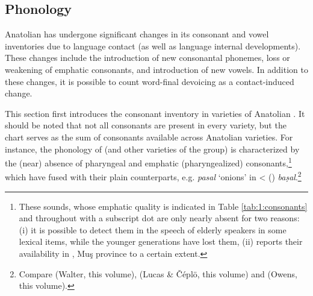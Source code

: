 \documentclass[output=paper]{langsci/langscibook}
\begin{document}
\subsection{Phonology}

Anatolian  has undergone significant changes in its consonant and vowel inventories due to language contact (as well as language internal developments). These changes include the introduction of new consonantal phonemes, loss or weakening of {emphatic consonants}, and introduction of new vowels. In addition to these changes, it is possible to count word-final {devoicing} as a contact-induced change.

This section first introduces the consonant inventory in varieties of Anatolian . It should be noted that not all consonants are present in every variety, but the chart serves as the sum of consonants available across Anatolian  varieties. For instance, the phonology of   (and other varieties of the  group) is characterized by the (near) absence of {pharyngeal} and {emphatic} ({pharyngealized}) consonants,\footnote{These sounds, whose {emphatic} quality is indicated in Table \ref{tab:1:consonants} and throughout with a subscript dot are only nearly absent for two reasons: (i) it is possible to detect them in the speech of elderly speakers in some lexical items, while the younger generations have lost them, (ii) \cite{Talay2001} reports their availability in , Muş province to a certain extent.} which have fused with their plain counterparts, e.g. \textit{pasal} `onions' in
 <  () \textit{baṣal}.\footnote{Compare   (Walter, this volume),  (Lucas \& Čéplö, this volume) and   (Owens, this volume).}
\end{document}
